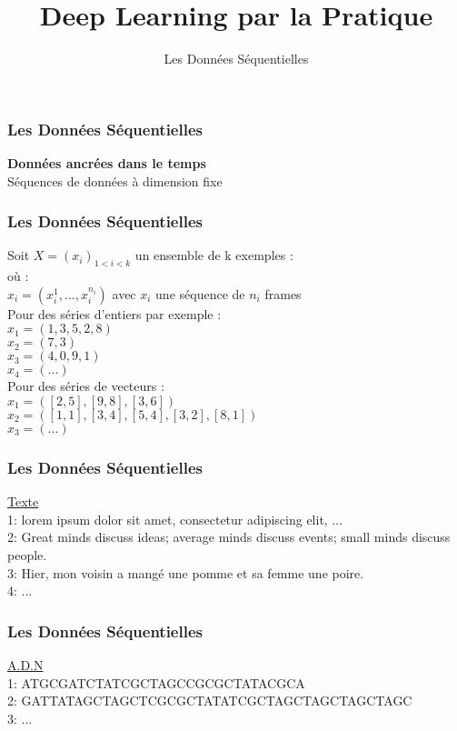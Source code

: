 \documentclass{formation}
\title{Deep Learning par la Pratique}
\subtitle{Les Données Séquentielles}
\begin{document}
\maketitle

\begin{frame}
  \frametitle{Les Données Séquentielles}
  \begin{center}
    \textbf{Données ancrées dans le temps} \\
    $\;$ \\
    Séquences de données à dimension fixe
  \end{center}
\end{frame}

\begin{frame}
  \frametitle{Les Données Séquentielles}
  Soit $X=(x_i)_{1<i<k}$ un ensemble de k exemples : \\
  où : \\
  $x_i = (x_{i}^1 , ... , x_{i}^{n_i})$ avec $x_i$ une séquence de $n_i$ frames \\
  \newline
  Pour des séries d'entiers par exemple : \\
  $x_1 = (1,3,5,2,8)$ \\
  $x_2 = (7,3)$ \\
  $x_3 = (4,0,9,1)$ \\
  $x_4 = (...)$ \\
  \newline
  Pour des séries de vecteurs : \\
  $x_1 = ([2,5],[9,8],[3,6])$ \\
  $x_2 = ([1,1],[3,4],[5,4],[3,2],[8,1])$ \\
  $x_3 = (...)$ 
\end{frame}

\begin{frame}
  \frametitle{Les Données Séquentielles}
  \underline{Texte} \\
  1: lorem ipsum dolor sit amet, consectetur adipiscing elit, ... \\
  2: Great minds discuss ideas; average minds discuss events; small minds discuss people. \\
  3: Hier, mon voisin a mangé une pomme et sa femme une poire. \\
  4: ...
\end{frame}

\begin{frame}
  \frametitle{Les Données Séquentielles}
  \underline{A.D.N} \\
  1: ATGCGATCTATCGCTAGCCGCGCTATACGCA \\
  2: GATTATAGCTAGCTCGCGCTATATCGCTAGCTAGCTAGCTAGC \\
  3: ...
\end{frame}
\end{document}
